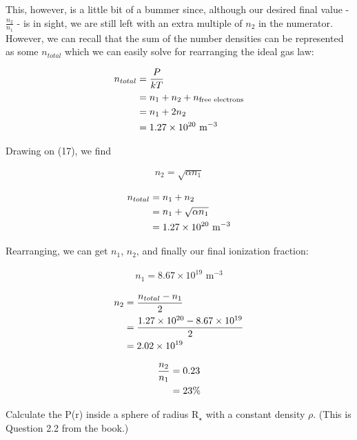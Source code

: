 \documentclass[12pt]{article}
\newenvironment{problem}[2][Problem]{\begin{trivlist}
\item[\hskip \labelsep {\bfseries #1}\hskip \labelsep {\bfseries #2.}]}{\end{trivlist}}
\newenvironment{answer}[2][Answer]{\begin{trivlist}
\item[\hskip \labelsep {\bfseries #1}\hskip \labelsep {\bfseries #2.}]}{\end{trivlist}}
\begin{document}
\begin{answer}{3}
This, however, is a little bit of a bummer since, although our desired final value - $\frac{n_2}{n_1}$ - is in sight, we are still left with an extra multiple of $n_2$ in the numerator. However, we can recall that the sum of the number densities can be represented as some $n_{total}$ which we can easily solve for rearranging the ideal gas law:

\begin{align}
  n_{total} &= \frac{P}{kT} \notag  \\
            &= n_1 + n_2 + n_{\text{free electrons}}  \notag  \\
            &= n_1 + 2n_2 \notag  \\
            &= 1.27 \times 10^{20} \text{ m$^{-3}$}
\end{align}

Drawing on (17), we find

\begin{align}
  n_2 = \sqrt{\alpha n_1}
\end{align}

\begin{align}
n_{total} &= n_1 + n_2 \notag \\
          &= n_1 + \sqrt{\alpha n_1} \notag \\
          &= 1.27 \times 10^{20} \text{ m$^{-3}$}
\end{align}

Rearranging, we can get $n_1$, $n_2$, and finally our final ionization fraction:

\begin{align}
n_1 = 8.67 \times 10^{19} \text{ m$^{-3}$}
\end{align}

\begin{align}
n_2 &= \frac{n_{total} - n_1}{2} \notag \\
    &= \frac{1.27 \times 10^{20} - 8.67 \times 10^{19}}{2} \notag \\
    &= 2.02 \times 10^{19}
\end{align}

\begin{align}
  \frac{n_2}{n_1} &= 0.23 \notag \\
                  &= 23 \%
\end{align}
\end{answer}
\bigskip
\bigskip




\begin{problem}{4}
Calculate the P(r) inside a sphere of radius R$_\star$ with a constant density $\rho$. (This is Question 2.2 from the book.)
\end{problem}
\end{document}
